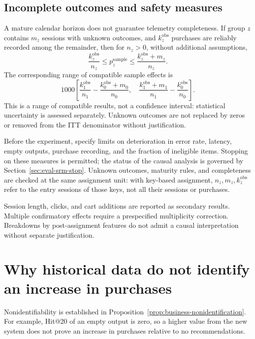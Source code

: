 \documentclass[12pt,a4paper]{article}
\theoremstyle{plainru}
\begin{document}
\subsection{Incomplete outcomes and safety measures}
\label{sec:eval-missing}

A mature calendar horizon does not guarantee telemetry completeness.
If group $z$ contains $m_z$ sessions with unknown outcomes,
and $k_z^{\mathrm{obs}}$ purchases are reliably recorded among the remainder,
then for $n_z>0$, without additional assumptions,
\begin{equation}\label{eq:eval-missing-rate}
 \frac{k_z^{\mathrm{obs}}}{n_z}\le p_z^{\mathrm{sample}}
 \le\frac{k_z^{\mathrm{obs}}+m_z}{n_z}.
\end{equation}
The corresponding range of compatible sample effects is
\begin{equation}\label{eq:eval-missing-effect}
 1000\left[
 \frac{k_1^{\mathrm{obs}}}{n_1}
 -\frac{k_0^{\mathrm{obs}}+m_0}{n_0},\quad
 \frac{k_1^{\mathrm{obs}}+m_1}{n_1}
 -\frac{k_0^{\mathrm{obs}}}{n_0}\right].
\end{equation}
This is a range of compatible results, not a confidence interval:
statistical uncertainty is assessed separately. Unknown outcomes
are not replaced by zeros or removed from the ITT denominator without justification.

Before the experiment, specify limits on deterioration in error rate, latency,
empty outputs, purchase recording, and the fraction of ineligible items.
Stopping on these measures is permitted; the status of the causal analysis
is governed by Section~\ref{sec:eval-srm-stop}. Unknown outcomes,
maturity rules, and completeness are checked at the same assignment unit:
with key-based assignment, $n_z,m_z,k_z^{\mathrm{obs}}$ refer to
the entry sessions of those keys, not all their sessions or purchases.

Session length, clicks, and cart additions are reported as secondary
results. Multiple confirmatory effects require a prespecified
multiplicity correction. Breakdowns by post-assignment features
do not admit a causal interpretation without separate justification.

\section{Why historical data do not identify an increase in purchases}
\label{sec:eval-identification}

Nonidentifiability is established in Proposition~\ref{prop:business-nonidentification}.
For example, Hit@20 of an empty output is zero, so a higher value from the new
system does not prove an increase in purchases relative to no recommendations.
\end{document}
